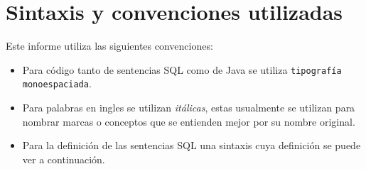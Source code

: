 \chapter{Sintaxis y convenciones utilizadas}
\label{apendice:sintaxis}
Este informe utiliza las siguientes convenciones:
%
\begin{itemize}
\item Para código tanto de sentencias SQL como de Java se utiliza \verb=tipografía monoespaciada=.
%
\item Para palabras en ingles se utilizan \textit{itálicas}, estas usualmente se utilizan para nombrar marcas o conceptos que se entienden mejor por su nombre original.
%
\item Para la definición de las sentencias SQL una sintaxis cuya definición se puede ver a continuación.
\end{itemize}
%

